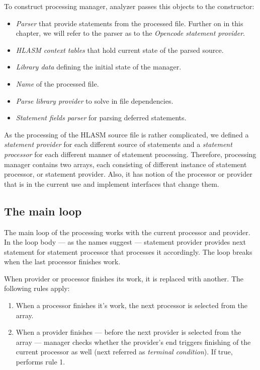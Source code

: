 To construct processing manager, analyzer passes this objects to the constructor:
\begin{itemize}
	\item \emph{Parser} that provide statements from the processed file. Further on in this chapter, we will refer to the parser as to the \emph{Opencode statement provider}.
	\item \emph{HLASM context tables} that hold current state of the parsed source.
	\item \emph{Library data} defining the initial state of the manager.
	\item \emph{Name} of the processed file.
	\item \emph{Parse library provider} to solve in file dependencies.
	\item \emph{Statement fields parser} for parsing deferred statements. 
\end{itemize}

As the processing of the HLASM source file is rather complicated, we defined a \emph{statement provider} for each different source of statements and a \emph{statement processor} for each different manner of statement processing. Therefore, processing manager contains two arrays, each consisting of different instance of statement processor, or statement provider.  Also, it has notion of the processor or provider that is in the current use and implement interfaces that change them.

\subsection{The main loop}

The main loop of the processing works with the current processor and provider. In the loop body --- as the names suggest --- statement provider provides next statement for statement processor that processes it accordingly. The loop breaks when the last processor finishes work.

When provider or processor finishes its work, it is replaced with another. The following rules apply:

\begin{enumerate}
	\item When a processor finishes it's work, the next processor is selected from the array.
	\item When a provider finishes --- before the next provider is selected from the array --- manager checks whether the provider's end triggers finishing of the current processor as well (next referred as \emph{terminal condition}). If true, performs rule 1.
\end{enumerate}

